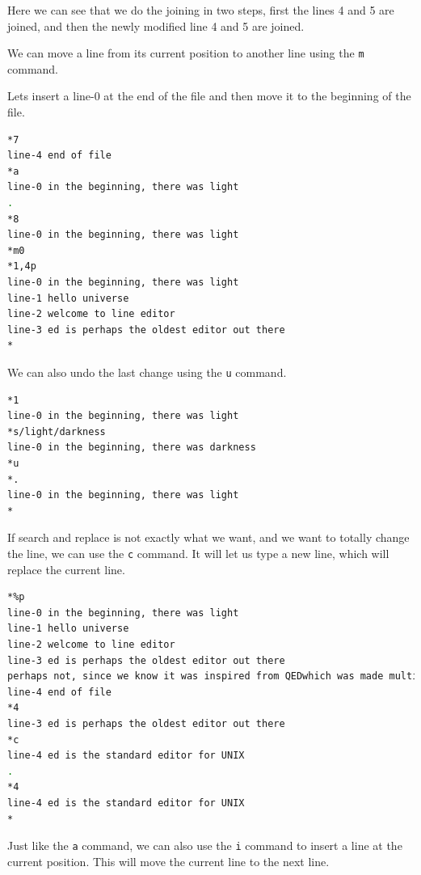 Here we can see that we do the joining in two steps,
first the lines 4 and 5 are joined,
and then the newly modified line 4 and 5 are joined.

We can move a line from its current position to another
line using the \texttt{m} command.

Lets insert a line-0 at the end of the file
and then move it to the beginning of the file.

\begin{lstlisting}[language=bash]
*7
line-4 end of file
*a
line-0 in the beginning, there was light
.
*8
line-0 in the beginning, there was light
*m0
*1,4p
line-0 in the beginning, there was light
line-1 hello universe
line-2 welcome to line editor
line-3 ed is perhaps the oldest editor out there
*
\end{lstlisting}

We can also undo the last change using the \texttt{u} command.

\begin{lstlisting}[language=bash]
*1
line-0 in the beginning, there was light
*s/light/darkness
line-0 in the beginning, there was darkness
*u
*.
line-0 in the beginning, there was light
*
\end{lstlisting}

If search and replace is not exactly what we want, and
we want to totally change the line, we can use the \texttt{c} command.
It will let us type a new line, which will replace the current line.

\begin{lstlisting}[language=bash]
*%p
line-0 in the beginning, there was light
line-1 hello universe
line-2 welcome to line editor
line-3 ed is perhaps the oldest editor out there
perhaps not, since we know it was inspired from QEDwhich was made multiple times by thompson and ritchiebefore ed was made.
line-4 end of file
*4
line-3 ed is perhaps the oldest editor out there
*c
line-4 ed is the standard editor for UNIX
.
*4
line-4 ed is the standard editor for UNIX
*
\end{lstlisting}

Just like the \texttt{a} command, we can also use the \texttt{i} command
to insert a line at the current position. This will move the current line
to the next line.

